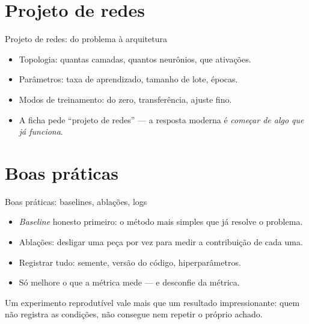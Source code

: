 \documentclass[aspectratio=169, 11pt]{beamer}
\begin{document}
\section{Projeto de redes}

\begin{frame}{Projeto de redes: do problema à arquitetura}
  \begin{itemize}\setlength{\itemsep}{0.4ex}
    \item Topologia: quantas camadas, quantos neurônios, que ativações.
    \item Parâmetros: taxa de aprendizado, tamanho de lote, épocas.
    \item Modos de treinamento: do zero, transferência, ajuste fino.
    \item A ficha pede ``projeto de redes'' — a resposta moderna é
          \emph{começar de algo que já funciona}.
  \end{itemize}
\end{frame}

\section{Boas práticas}

\begin{frame}{Boas práticas: baselines, ablações, logs}
  \begin{itemize}\setlength{\itemsep}{0.4ex}
    \item \emph{Baseline} honesto primeiro: o método mais simples que já
          resolve o problema.
    \item Ablações: desligar uma peça por vez para medir a contribuição de
          cada uma.
    \item Registrar tudo: semente, versão do código, hiperparâmetros.
    \item Só melhore o que a métrica mede — e desconfie da métrica.
  \end{itemize}
  \begin{ideiabox}
    Um experimento reprodutível vale mais que um resultado impressionante:
    quem não registra as condições, não consegue nem repetir o próprio
    achado.
  \end{ideiabox}
\end{frame}
\end{document}
